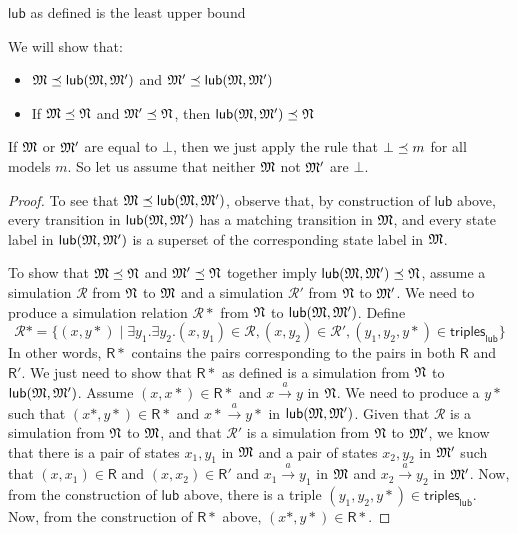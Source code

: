 

\begin{lemma}
$\mathsf{lub}$ as defined is the least upper bound
\end{lemma}
We will show that:
\begin{itemize}
\item
$\frak{M} \preceq \mathsf{lub}(\frak{M}, \frak{M}')$ and $\frak{M}' \preceq \mathsf{lub}(\frak{M}, \frak{M}')$
\item
If $\frak{M} \preceq \frak{N} $ and $\frak{M}' \preceq \frak{N} $, then $\mathsf{lub}(\frak{M}, \frak{M}') \preceq \frak{N}$
\end{itemize}
If $\frak{M}$ or $ \frak{M}'$ are equal to $\bot$, then we just apply the rule that $\bot \preceq m$ for all models $m$. 
So let us assume that neither $\frak{M}$ not $\frak{M}'$ are $\bot$.

\begin{proof}
To see that $\frak{M} \preceq \mathsf{lub}(\frak{M}, \frak{M}')$, observe that, by construction of $\mathsf{lub}$ above, every transition in $\mathsf{lub}(\frak{M}, \frak{M}')$ has a matching transition in $\frak{M}$, and every state label in  $\mathsf{lub}(\frak{M}, \frak{M}')$ is a superset of the corresponding state label in $\frak{M}$.

To show that $\frak{M} \preceq \frak{N} $ and $\frak{M}' \preceq \frak{N} $ together imply $\mathsf{lub}(\frak{M}, \frak{M}') \preceq \frak{N}$, assume a simulation $\mathcal{R}$ from $\frak{N}$ to $\frak{M}$ and a simulation $\mathcal{R}'$ from $\frak{N}$ to $\frak{M}'$.
We need to produce a simulation relation $\mathcal{R}*$ from $\frak{N}$ to $\mathsf{lub}(\frak{M}, \frak{M}')$.
Define
\[
\mathcal{R}* =   \{(x, y*) \; | \; \exists y_1 . \exists y_2 . (x,y_1) \in \mathcal{R}, (x,y_2) \in \mathcal{R}', (y_1,y_2,y*) \in \mathsf{triples}_\mathsf{lub} \}
\]
In other words, $\mathsf{R}*$ contains the pairs corresponding to the pairs in both $\mathsf{R}$ and $\mathsf{R}'$.
We just need to show that $\mathsf{R}*$ as defined is a simulation from $\frak{N}$ to $\mathsf{lub}(\frak{M}, \frak{M}')$.
Assume $(x,x*) \in \mathsf{R}*$ and $x \xrightarrow{a} y$ in $\frak{N}$. 
We need to produce a $y*$ such that $(x*,y*) \in \mathsf{R}*$ and $x* \xrightarrow{a} y*$ in $\mathsf{lub}(\frak{M}, \frak{M}')$.
Given that $\mathcal{R}$ is a simulation from $\frak{N}$ to $\frak{M}$, and that  $\mathcal{R}'$ is a simulation from $\frak{N}$ to $\frak{M}'$, we know that there is a pair of states $x_1, y_1$ in $\frak{M}$ and a pair of states $x_2, y_2$ in $\frak{M}'$ such that $(x,x_1) \in \mathsf{R}$ and $(x,x_2) \in \mathsf{R}'$ and $x_1 \xrightarrow{a} y_1$ in $\frak{M}$ and $x_2 \xrightarrow{a} y_2$ in $\frak{M}'$.
Now, from the construction of $\mathsf{lub}$ above, there is a triple $(y_1, y_2, y*) \in \mathsf{triples}_\mathsf{lub}$.
Now, from the construction of $\mathsf{R}*$ above, $(x*,y*) \in \mathsf{R}*$.


\end{proof}
